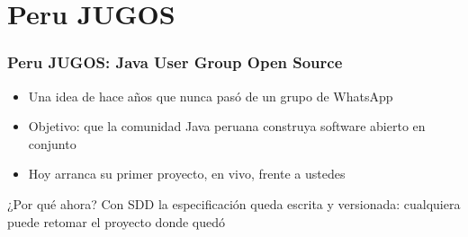 \section{Peru JUGOS}
\begin{frame}
    \frametitle{Peru JUGOS: Java User Group Open Source}
    \begin{itemize}
        \item Una idea de hace años que nunca pasó de un grupo de WhatsApp
        \item Objetivo: que la comunidad Java peruana construya software abierto en conjunto
        \item Hoy arranca su primer proyecto, en vivo, frente a ustedes
    \end{itemize}
    \begin{alertblock}{¿Por qué ahora?}
        Con SDD la especificación queda escrita y versionada: cualquiera puede retomar el proyecto donde quedó
    \end{alertblock}
\end{frame}
